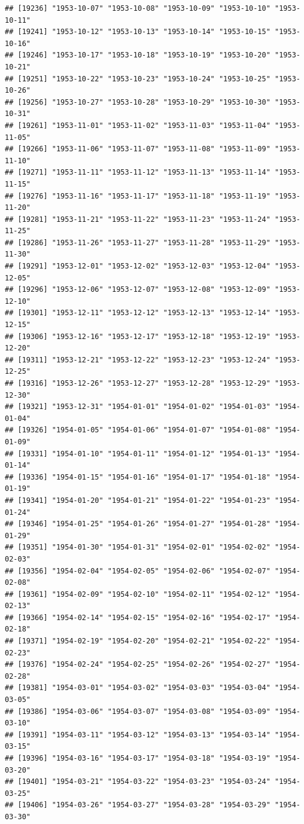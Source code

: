 \documentclass{article}\usepackage[]{graphicx}\usepackage[]{color}
\makeatletter
\newenvironment{kframe}{%
 \def\at@end@of@kframe{}%
 \ifinner\ifhmode%
  \def\at@end@of@kframe{\end{minipage}}%
  \begin{minipage}{\columnwidth}%
 \fi\fi%
 \def\FrameCommand##1{\hskip\@totalleftmargin \hskip-\fboxsep
 \colorbox{shadecolor}{##1}\hskip-\fboxsep
     \hskip-\linewidth \hskip-\@totalleftmargin \hskip\columnwidth}%
 \MakeFramed {\advance\hsize-\width
   \@totalleftmargin\z@ \linewidth\hsize
   \@setminipage}}%
 {\par\unskip\endMakeFramed%
 \at@end@of@kframe}
\newenvironment{knitrout}{}{} %
\makeatother
\begin{document}
\begin{description}
\begin{knitrout}
\begin{kframe}
\begin{verbatim}
## [19236] "1953-10-07" "1953-10-08" "1953-10-09" "1953-10-10" "1953-10-11"
## [19241] "1953-10-12" "1953-10-13" "1953-10-14" "1953-10-15" "1953-10-16"
## [19246] "1953-10-17" "1953-10-18" "1953-10-19" "1953-10-20" "1953-10-21"
## [19251] "1953-10-22" "1953-10-23" "1953-10-24" "1953-10-25" "1953-10-26"
## [19256] "1953-10-27" "1953-10-28" "1953-10-29" "1953-10-30" "1953-10-31"
## [19261] "1953-11-01" "1953-11-02" "1953-11-03" "1953-11-04" "1953-11-05"
## [19266] "1953-11-06" "1953-11-07" "1953-11-08" "1953-11-09" "1953-11-10"
## [19271] "1953-11-11" "1953-11-12" "1953-11-13" "1953-11-14" "1953-11-15"
## [19276] "1953-11-16" "1953-11-17" "1953-11-18" "1953-11-19" "1953-11-20"
## [19281] "1953-11-21" "1953-11-22" "1953-11-23" "1953-11-24" "1953-11-25"
## [19286] "1953-11-26" "1953-11-27" "1953-11-28" "1953-11-29" "1953-11-30"
## [19291] "1953-12-01" "1953-12-02" "1953-12-03" "1953-12-04" "1953-12-05"
## [19296] "1953-12-06" "1953-12-07" "1953-12-08" "1953-12-09" "1953-12-10"
## [19301] "1953-12-11" "1953-12-12" "1953-12-13" "1953-12-14" "1953-12-15"
## [19306] "1953-12-16" "1953-12-17" "1953-12-18" "1953-12-19" "1953-12-20"
## [19311] "1953-12-21" "1953-12-22" "1953-12-23" "1953-12-24" "1953-12-25"
## [19316] "1953-12-26" "1953-12-27" "1953-12-28" "1953-12-29" "1953-12-30"
## [19321] "1953-12-31" "1954-01-01" "1954-01-02" "1954-01-03" "1954-01-04"
## [19326] "1954-01-05" "1954-01-06" "1954-01-07" "1954-01-08" "1954-01-09"
## [19331] "1954-01-10" "1954-01-11" "1954-01-12" "1954-01-13" "1954-01-14"
## [19336] "1954-01-15" "1954-01-16" "1954-01-17" "1954-01-18" "1954-01-19"
## [19341] "1954-01-20" "1954-01-21" "1954-01-22" "1954-01-23" "1954-01-24"
## [19346] "1954-01-25" "1954-01-26" "1954-01-27" "1954-01-28" "1954-01-29"
## [19351] "1954-01-30" "1954-01-31" "1954-02-01" "1954-02-02" "1954-02-03"
## [19356] "1954-02-04" "1954-02-05" "1954-02-06" "1954-02-07" "1954-02-08"
## [19361] "1954-02-09" "1954-02-10" "1954-02-11" "1954-02-12" "1954-02-13"
## [19366] "1954-02-14" "1954-02-15" "1954-02-16" "1954-02-17" "1954-02-18"
## [19371] "1954-02-19" "1954-02-20" "1954-02-21" "1954-02-22" "1954-02-23"
## [19376] "1954-02-24" "1954-02-25" "1954-02-26" "1954-02-27" "1954-02-28"
## [19381] "1954-03-01" "1954-03-02" "1954-03-03" "1954-03-04" "1954-03-05"
## [19386] "1954-03-06" "1954-03-07" "1954-03-08" "1954-03-09" "1954-03-10"
## [19391] "1954-03-11" "1954-03-12" "1954-03-13" "1954-03-14" "1954-03-15"
## [19396] "1954-03-16" "1954-03-17" "1954-03-18" "1954-03-19" "1954-03-20"
## [19401] "1954-03-21" "1954-03-22" "1954-03-23" "1954-03-24" "1954-03-25"
## [19406] "1954-03-26" "1954-03-27" "1954-03-28" "1954-03-29" "1954-03-30"

\end{verbatim}
\end{kframe}
\end{knitrout}
\end{description}
\end{document}
